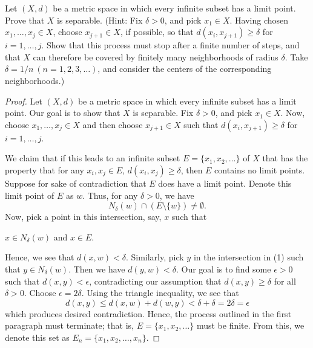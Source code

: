 \documentclass[a4paper]{article}
\begin{document}
   \begin{problem}
      Let \( (X,d)  \) be a metric space in which every infinite subset has a limit point. Prove that \( X  \) is separable. (Hint: Fix \( \delta > 0  \), and pick \( {x}_{1} \in X  \). Having chosen \( {x}_{1}, \dots, {x}_{j} \in X  \), choose \( {x}_{j+1} \in X  \), if possible, so that \( d({x}_{i}, {x}_{j+1}) \geq \delta \) for \( i = 1,\dots, j \). Show that this process must stop after a finite number of steps, and that \( X  \) can therefore be covered by finitely many neighborhoods of radius \( \delta  \). Take \( \delta = 1/n \ (n = 1,2,3,\dots) \), and consider the centers of the corresponding neighborhoods.)
   \end{problem}
   \begin{proof}
   Let \( (X,d) \) be a metric space in which every infinite subset has a limit point. Our goal is to show that \( X  \) is separable. Fix \( \delta > 0  \), and pick \( {x}_{1} \in X  \). Now, choose \( {x}_{1}, \dots, {x}_{j } \in X  \) and then choose \( {x}_{j+1} \in X  \) such that \( d({x}_{i}, {x}_{j+1}) \geq \delta \) for \( i = 1, \dots, j  \). 

   We claim that if this leads to an infinite subset \( E =  \{ {x}_{1}, {x}_{2}, \dots \}   \) of \( X  \) that has the property that for any \( {x}_{i}, {x}_{j} \in E   \), \( d({x}_{i}, {x}_{j}) \geq \delta \), then \( E  \) contains no limit points. Suppose for sake of contradiction that \( E  \) does have a limit point. Denote this limit point of \( E  \) as \( w  \). Thus, for any \( \delta > 0  \), we have  
   \[  {N}_{\delta}(w) \cap (E \setminus  \{ w \} ) \neq \emptyset.  \tag{1} \]
   Now, pick a point in this intersection, say, \( x  \) such that 
   \begin{center}
       \( x \in {N}_{\delta}(w)  \) and \( x \in E  \).
   \end{center}
   Hence, we see that \( d(x,w) < \delta \). Similarly, pick \( y  \) in the intersection in (1) such that \( y \in {N}_{\delta}(w) \). Then we have \( d(y,w) < \delta \). Our goal is to find some \( \epsilon > 0  \) such that \( d(x,y) < \epsilon  \), contradicting our assumption that \( d(x,y) \geq \delta \) for all \( \delta > 0 \). Choose \( \epsilon = 2 \delta \). Using the triangle inequality, we see that 
   \[  d(x,y) \leq d(x,w) + d(w,y) < \delta + \delta = 2 \delta = \epsilon \]
   which produces desired contradiction. Hence, the process outlined in the first paragraph must terminate; that is, \( E =  \{ {x}_{1}, {x}_{2}, \dots \}  \) must be finite. From this, we denote this set as \( {E}_{n} = \{ {x}_{1}, {x}_{2}, \dots, {x}_{n}  \}  \).


\end{proof}
\end{document}
